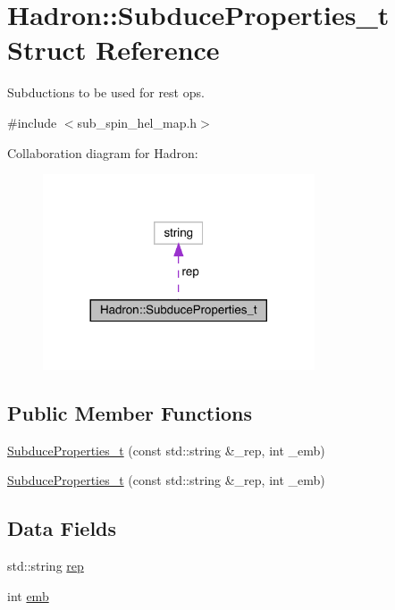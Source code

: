 \hypertarget{structHadron_1_1SubduceProperties__t}{}\section{Hadron\+:\+:Subduce\+Properties\+\_\+t Struct Reference}
\label{structHadron_1_1SubduceProperties__t}


Subductions to be used for rest ops.  




{\ttfamily \#include $<$sub\+\_\+spin\+\_\+hel\+\_\+map.\+h$>$}



Collaboration diagram for Hadron\+:\nopagebreak
\begin{figure}[H]
\begin{center}
\leavevmode
\includegraphics[width=228pt]{d9/d19/structHadron_1_1SubduceProperties__t__coll__graph}
\end{center}
\end{figure}
\subsection*{Public Member Functions}
\begin{DoxyCompactItemize}
\item 
\mbox{\hyperlink{structHadron_1_1SubduceProperties__t_a265cb361b85b50a1619fda24fc575389}{Subduce\+Properties\+\_\+t}} (const std\+::string \&\+\_\+rep, int \+\_\+emb)
\item 
\mbox{\hyperlink{structHadron_1_1SubduceProperties__t_a265cb361b85b50a1619fda24fc575389}{Subduce\+Properties\+\_\+t}} (const std\+::string \&\+\_\+rep, int \+\_\+emb)
\end{DoxyCompactItemize}
\subsection*{Data Fields}
\begin{DoxyCompactItemize}
\item 
std\+::string \mbox{\hyperlink{structHadron_1_1SubduceProperties__t_a0983c7ff2504c5d4a32467371090f08d}{rep}}
\item 
int \mbox{\hyperlink{structHadron_1_1SubduceProperties__t_a3204da77d97084fac69eff126dcf6663}{emb}}
\end{DoxyCompactItemize}


